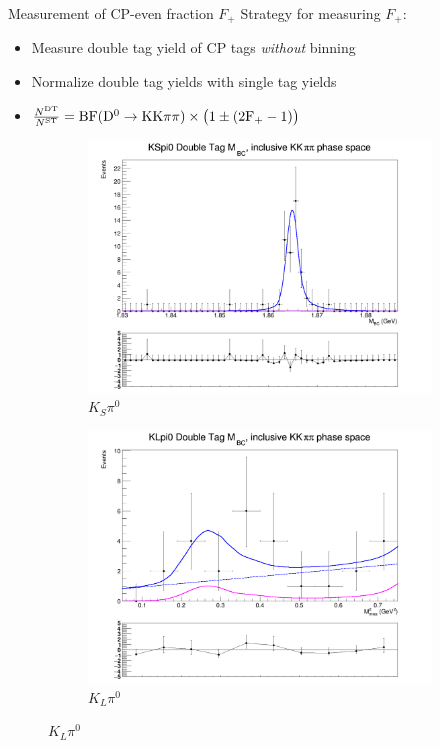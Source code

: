 \documentclass{beamer}
\begin{document}
\begin{frame}{Measurement of CP-even fraction $F_+$}
  Strategy for measuring $F_+$:
  \begin{itemize}
    \setlength\itemsep{0.5em}
    \item{Measure double tag yield of CP tags \textit{without} binning}
    \item{Normalize double tag yields with single tag yields}
    \item{$\frac{N^{\rm DT}}{N^{\rm ST}} = \rm{BF}(D^0\to KK\pi\pi)\times\big(1\pm(2F_+ - 1)\big)$}
  \end{itemize}
  \begin{figure}
    \centering
    \vspace{-0.2cm}
    \begin{subfigure}{0.45\textwidth}
      \includegraphics[width = 1.0\textwidth]{Plots/DoubleTagYield_DoubleTag_CP_KKpipi_vs_KSpi0_SignalBin0.png}
      \caption{$K_S\pi^0$}
    \end{subfigure}%
    \begin{subfigure}{0.45\textwidth}
      \includegraphics[width = 1.0\textwidth]{Plots/DoubleTagYield_DoubleTag_CP_KKpipi_vs_KLpi0_SignalBin0.png}
      \caption{$K_L\pi^0$}
    \end{subfigure}
  \end{figure}
\end{frame}
\end{document}
